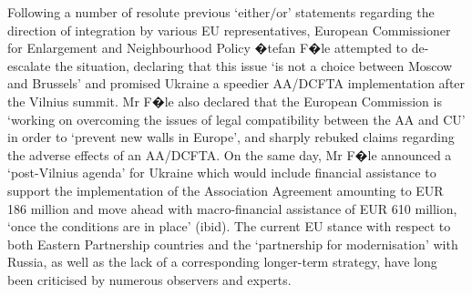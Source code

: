 Following a number of resolute previous `either$/$or' statements regarding the direction of integration by various EU representatives, European Commissioner for Enlargement and Neighbourhood Policy �tefan F�le attempted to de-escalate the situation, declaring that this issue `is not a choice between Moscow and Brussels' and promised Ukraine a speedier AA/DCFTA implementation after the Vilnius summit. Mr F�le also declared that the European Commission is `working on overcoming the issues of legal compatibility between the AA and CU' in order to `prevent new walls in Europe', and sharply rebuked claims regarding the adverse effects of an AA/DCFTA. On the same day, Mr F�le announced a `post-Vilnius agenda' for Ukraine which would include financial assistance to support the implementation of the Association Agreement amounting to EUR 186 million and move ahead with macro-financial assistance of EUR 610 million, `once the conditions are in place' (ibid). The current EU stance with respect to both Eastern Partnership countries and the `partnership for modernisation' with Russia, as well as the lack of a corresponding longer-term strategy, have long been criticised by numerous observers and experts.

